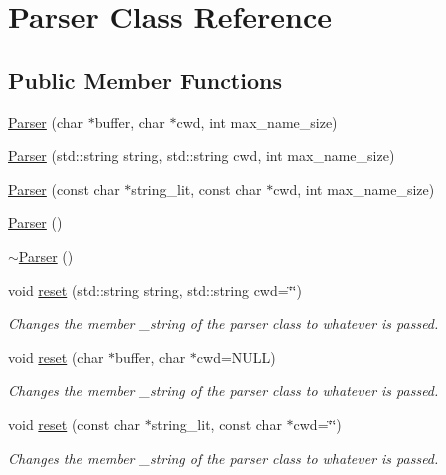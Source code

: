 \hypertarget{classParser}{}\section{Parser Class Reference}
\label{classParser}
\subsection*{Public Member Functions}
\begin{DoxyCompactItemize}
\item 
\mbox{\hyperlink{classParser_a306c6c33d7a6cf1bb682be360fcfe982}{Parser}} (char $\ast$buffer, char $\ast$cwd, int max\+\_\+name\+\_\+size)
\item 
\mbox{\hyperlink{classParser_ada33680bf5f723ef95c44eeed1bff451}{Parser}} (std\+::string string, std\+::string cwd, int max\+\_\+name\+\_\+size)
\item 
\mbox{\hyperlink{classParser_a5168f5c44e9649e71796f9bef48bdbbe}{Parser}} (const char $\ast$string\+\_\+lit, const char $\ast$cwd, int max\+\_\+name\+\_\+size)
\item 
\mbox{\hyperlink{classParser_a12234f6cd36b61af4b50c94a179422c1}{Parser}} ()
\item 
\mbox{\hyperlink{classParser_a3e658b5917a93a3ef648050d060e3a93}{$\sim$\+Parser}} ()
\item 
void \mbox{\hyperlink{classParser_a87f5e73ca10ef5f84f37a4b37e0e6f59}{reset}} (std\+::string string, std\+::string cwd=\char`\"{}\char`\"{})
\begin{DoxyCompactList}\small\item\em Changes the member \+\_\+string of the parser class to whatever is passed. \end{DoxyCompactList}\item 
void \mbox{\hyperlink{classParser_a5e097c301e171481e8d2af91c112e35e}{reset}} (char $\ast$buffer, char $\ast$cwd=N\+U\+LL)
\begin{DoxyCompactList}\small\item\em Changes the member \+\_\+string of the parser class to whatever is passed. \end{DoxyCompactList}\item 
void \mbox{\hyperlink{classParser_ab51b81b1617f1948205d73804e3c0fb9}{reset}} (const char $\ast$string\+\_\+lit, const char $\ast$cwd=\char`\"{}\char`\"{})
\begin{DoxyCompactList}\small\item\em Changes the member \+\_\+string of the parser class to whatever is passed. \end{DoxyCompactList}\item 

\end{DoxyCompactItemize}

